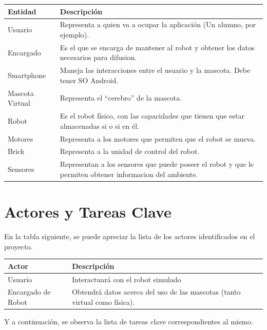\documentclass[letterpaper,12pt]{article} %
\numberwithin{equation}{section} %
\numberwithin{figure}{section} %
\numberwithin{table}{section} %
\begin{document}
\begin{table}[H]
  \centering
  \begin{tabular}{p{5cm}p{9cm}}\hline
    Entidad & Descripci\'on \\ \hline \hline %
    Usuario & Representa a quien va a ocupar la aplicaci\'on (Un alumno, por ejemplo). \\ \hline
    Encargado & Es el que se encarga de mantener al robot y obtener los datos necesarios para difusion. \\ \hline
    Smartphone & Maneja las interacciones entre el usuario y la mascota. Debe tener SO Android. \\ \hline
    Mascota Virtual & Representa el ``cerebro'' de la mascota. \\ \hline
    Robot & Es el robot f\'isico, con las capacidades que tienen que estar almacenadas si o si en \'el. \\ \hline
    Motores & Representa a los motores que permiten que el robot se mueva. \\ \hline
    Brick & Representa a la unidad de control del robot. \\ \hline
    Sensores & Representan a los sensores que puede poseer el robot y que le permiten obtener informacion del ambiente. \\ \hline \hline
  \end{tabular}
\end{table}

\newpage
\section{Actores y Tareas Clave}

En la tabla siguiente, se puede apreciar la lista de los actores identificados en el proyecto.\\

\begin{table}[H]
  \centering
  \begin{tabular}{p{5cm}p{9cm}}\hline
    Actor & Descripci\'on \\ \hline \hline %
    Usuario & Interactuar\'a con el robot simulado \\ \hline
    Encargado de Robot & Obtendr\'a datos acerca del uso de las mascotas (tanto virtual como f\'isica).\\ \hline \hline
  \end{tabular}
\end{table}

Y a continuaci\'on, se observa la lista de tareas clave correspondientes al mismo.\\
\end{document}
